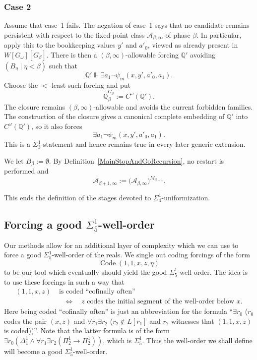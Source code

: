 \documentclass[a4paper,11pt]{article}
\newcommand{\forceQ}{\mathbb{Q}}
\begin{document}
\subsubsection{Case 2}

Assume that case~1 fails. The negation of case~1 says that no candidate remains persistent with respect to the fixed-point class $\mathcal A_{\beta,\infty}$ of phase $\beta$. In particular, apply this to the bookkeeping values $y'$ and $a'_0$, viewed as already present in $W[G_\omega][G_\beta]$. There is then a $(\beta,\infty)$-allowable forcing $\forceQ'$ avoiding $(B_\eta\mid\eta<\beta)$ such that
\[
\forceQ'\Vdash\exists a_1\neg\psi_m(x,y',a'_0,a_1).
\]
Choose the $<$-least such forcing and put
\[
\dot{\forceQ}_\beta^{G_\beta}:=C^\omega(\forceQ').
\]
The closure remains $(\beta,\infty)$-allowable and avoids the current forbidden families. The construction of the closure gives a canonical complete embedding of $\forceQ'$ into $C^\omega(\forceQ')$, so it also forces
\[
\exists a_1\neg\psi_m(x,y',a'_0,a_1).
\]
This is a $\Sigma^1_3$-statement and hence remains true in every later generic extension.

We let $B_\beta:=\emptyset$. By Definition~\ref{MainStopAndGoRecursion}, no restart is performed and
\[
\mathcal A_{\beta+1,\infty}
:=\bigl(\mathcal A_{\beta,\infty}\bigr)^{M_{\beta+1}}.
\]

This ends the definition of the stages devoted to $\Sigma^1_4$-uniformization.

\subsection{Forcing a good \texorpdfstring{$\Sigma^1_5$}{Sigma15}-well-order}
Our methods allow for an additional layer of complexity which we can use to force a good $\Sigma^1_5$-well-order of the reals.
We single out coding forcings of the form
\[
\operatorname{Code}(1,1,x,z,\eta)
\]
to be our tool which eventually should yield the good $\Sigma^1_5$-well-order.
The idea is to use these forcings in such a way that
\begin{align*}
(1,1,x,z)&\text{ is coded ``cofinally often''}\\
&\quad\Longleftrightarrow\quad
\text{$z$ codes the initial segment of the well-order below $x$.}
\end{align*}
Here being coded ``cofinally often'' is just an abbreviation for the formula ``$\exists r_0$ ($r_0$ codes the pair $(x,z)$ and $\forall r_1\exists r_2$ ($r_2\notin L[r_1]$ and $r_2$ witnesses that $(1,1,x,z)$ is coded))''. Note that the latter formula is of the form $\exists r_0(\Delta^1_1\land\forall r_1\exists r_2(\Pi^1_2\rightarrow\Pi^1_2))$, which is $\Sigma^1_5$.
Thus the well-order we shall define will become a good $\Sigma^1_5$-well-order.
\end{document}
